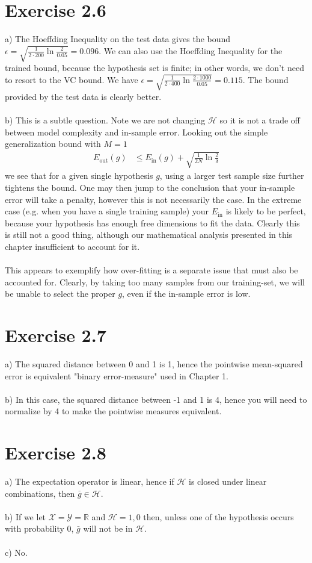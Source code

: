 \documentclass[11pt,letterpaper]{article}
\begin{document}
\section*{Exercise 2.6}
a) The Hoeffding Inequality on the test data gives the bound $\epsilon = \sqrt{\frac{1}{2\cdot200}\ln \frac{2}{0.05}} = 0.096$.  We can also use the Hoeffding Inequality for the trained bound, because the hypothesis set is finite; in other words, we don't need to resort to the VC bound.  We have $\epsilon = \sqrt{\frac{1}{2\cdot400}\ln\frac{2\cdot1000}{0.05}} = 0.115$.  The bound provided by the test data is clearly better.
\\\\
b) This is a subtle question.  Note we are not changing $\mathcal{H}$ so it is not a trade off between model complexity and in-sample error.  Looking out the simple generalization bound with $M = 1$
\begin{align*}
    E_\textrm{out}(g) &\le E_\textrm{in}(g) + \sqrt{\frac{1}{2N}\ln\frac{2}{\delta}}
\end{align*}
we see that for a given single hypothesis $g$, using a larger test sample size further tightens the bound.  One may then jump to the conclusion that your in-sample error will take a penalty, however this is not necessarily the case.  In the extreme case (e.g. when you have a single training sample) your $E_\textrm{in}$ is likely to be perfect, because your hypothesis has enough free dimensions to fit the data. Clearly this is still not a good thing, although our mathematical analysis presented in this chapter insufficient to account for it.
\\\\
This appears to exemplify how over-fitting is a separate issue that must also be accounted for.  Clearly, by taking too many samples from our training-set, we will be unable to select the proper $g$, even if the in-sample error is low.

\section*{Exercise 2.7}
a) The squared distance between 0 and 1 is 1, hence the pointwise mean-squared error is equivalent "binary error-measure" used in Chapter 1.
\\\\
b) In this case, the squared distance between -1 and 1 is 4, hence you will need to normalize by 4 to make the pointwise measures equivalent.

\section*{Exercise 2.8}
a) The expectation operator is linear, hence if $\mathcal{H}$ is closed under linear combinations, then $\bar{g} \in \mathcal{H}$.
\\\\
b) If we let $\mathcal{X} = \mathcal{Y} = \mathbb{R}$ and $\mathcal{H} = {1, 0}$ then, unless one of the hypothesis occurs with probability 0, $\bar{g}$ will not be in $\mathcal{H}$.
\\\\
c) No.
\end{document}
